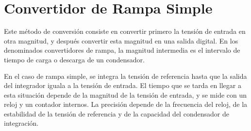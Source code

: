 \chapter{Convertidor de Rampa Simple}
Este método de conversión consiste en convertir primero la tensión de entrada en otra magnitud, y después convertir esta magnitud en una salida digital. En los denominados convertidores de rampa, la magnitud intermedia es el intervalo de tiempo de carga o descarga de un condensador.

En el caso de rampa simple, se integra la tensión de referencia hasta que la salida del integrador iguala a la tensión de entrada. El tiempo que se tarda en llegar a esta situación depende de la magnitud de la tensión de entrada, y se mide con un reloj y un contador internos. La precisión depende de la frecuencia del reloj, de la estabilidad de la tensión de referencia y de la capacidad del condensador de integración.

